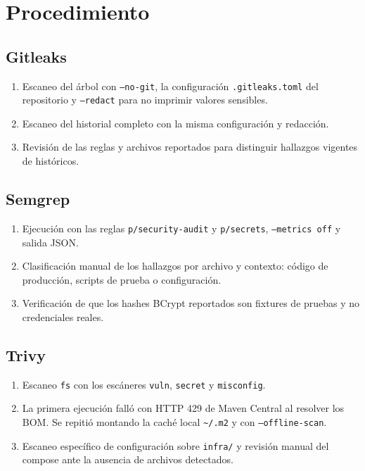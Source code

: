 \documentclass[11pt]{article}
\begin{document}
\section{Procedimiento}

\subsection{Gitleaks}

\begin{enumerate}
  \item Escaneo del árbol con \texttt{--no-git}, la configuración
  \texttt{.gitleaks.toml} del repositorio y \texttt{--redact} para no imprimir
  valores sensibles.
  \item Escaneo del historial completo con la misma configuración y redacción.
  \item Revisión de las reglas y archivos reportados para distinguir hallazgos
  vigentes de históricos.
\end{enumerate}

\subsection{Semgrep}

\begin{enumerate}
  \item Ejecución con las reglas \texttt{p/security-audit} y \texttt{p/secrets},
  \texttt{--metrics off} y salida JSON.
  \item Clasificación manual de los hallazgos por archivo y contexto: código de
  producción, scripts de prueba o configuración.
  \item Verificación de que los hashes BCrypt reportados son fixtures de pruebas
  y no credenciales reales.
\end{enumerate}

\subsection{Trivy}

\begin{enumerate}
  \item Escaneo \texttt{fs} con los escáneres \texttt{vuln}, \texttt{secret} y
  \texttt{misconfig}.
  \item La primera ejecución falló con HTTP 429 de Maven Central al resolver
  los BOM. Se repitió montando la caché local \texttt{\textasciitilde/.m2} y
  con \texttt{--offline-scan}.
  \item Escaneo específico de configuración sobre \texttt{infra/} y revisión
  manual del compose ante la ausencia de archivos detectados.
\end{enumerate}
\end{document}
